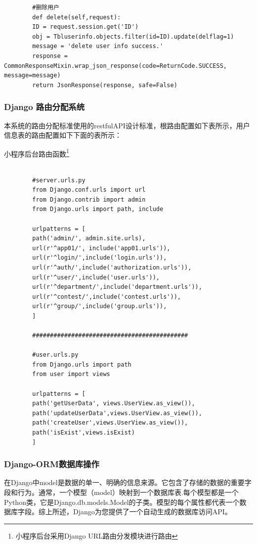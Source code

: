 \documentclass[a4paper]{ltxdoc}
\begin{document}
{\begin{verbatim}
		#删除用户
		def delete(self,request):
		ID = request.session.get('ID')
		obj = Tbluserinfo.objects.filter(id=ID).update(delflag=1)
		message = 'delete user info success.'
		response = CommonResponseMixin.wrap_json_response(code=ReturnCode.SUCCESS, message=message)
		return JsonResponse(response, safe=False)
		\end{verbatim}
		
		\subsubsection{Django 路由分配系统}
		
		本系统的路由分配标准使用的restfulAPI设计标准，根路由配置如下表所示，用户信息表的路由配置如下下面的表所示：
		
		小程序后台路由函数\footnote{小程序后台采用Django URL路由分发模块进行路由}
		\begin{verbatim}
		
		#server.urls.py
		from Django.conf.urls import url
		from Django.contrib import admin
		from Django.urls import path, include
		
		urlpatterns = [
		path('admin/', admin.site.urls),
		url(r'^app01/', include('app01.urls')),
		url(r'^login/',include('login.urls')),
		url(r'^auth/',include('authorization.urls')),
		url(r'^user/',include('user.urls')),
		url(r'^department/',include('department.urls')),
		url(r'^contest/',include('contest.urls')),
		url(r'^group/',include('group.urls')),
		]
		
		############################################
		
		#user.urls.py
		from Django.urls import path
		from user import views
		
		urlpatterns = [
		path('getUserData', views.UserView.as_view()),
		path('updateUserData',views.UserView.as_view()),
		path('createUser',views.UserView.as_view()),
		path('isExist',views.isExist)
		]
		\end{verbatim}
		
		\subsubsection{Django-ORM数据库操作}
		在Django中model是数据的单一、明确的信息来源。它包含了存储的数据的重要字段和行为。通常，一个模型（model）映射到一个数据库表.每个模型都是一个Python类，它是Django.db.models.Model的子类。模型的每个属性都代表一个数据库字段。综上所述，Django为您提供了一个自动生成的数据库访问API。
		
}
\end{document}
